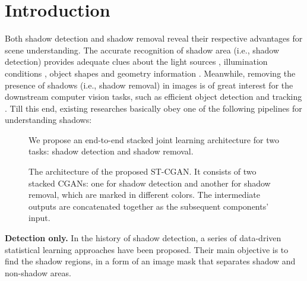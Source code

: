 \documentclass[10pt,twocolumn,letterpaper]{article}
\begin{document}
\section{Introduction}

Both shadow detection and shadow removal reveal their respective advantages for scene understanding. The accurate recognition of shadow area (i.e., shadow detection) provides adequate clues about the light sources \cite{lalonde2009estimating}, illumination conditions \cite{panagopoulos2009robust,panagopoulos2011illumination,panagopoulos2013simultaneous}, object shapes \cite{okabe2009attached} and geometry information \cite{junejo2008estimating,karsch2011rendering}. Meanwhile, removing the presence of shadows (i.e., shadow removal) in images is of great interest for the downstream computer vision tasks, such as efficient object detection and tracking \cite{cucchiara2001improving,mikic2000moving}. Till this end, existing researches basically obey one of the following pipelines for understanding shadows:

\begin{figure}[t]
	\begin{center}
		\setlength{\fboxrule}{0pt}
	\end{center}
	\vspace{-10pt}
	\caption{We propose an end-to-end stacked joint learning architecture for two tasks: shadow detection and shadow removal.}
	\label{fig_tasks_cropped}
	\vspace{-12pt}
\end{figure}

\begin{figure*}[t]
	\begin{center}
		\setlength{\fboxrule}{0pt}
	\end{center}
	\vspace{-8pt}
	\caption{The architecture of the proposed ST-CGAN. It consists of two stacked CGANs: one for shadow detection and another for shadow removal, which are marked in different colors. The intermediate outputs are concatenated together as the subsequent components' input. }	
	\label{fig_pipeline_cropped}
	\vspace{-8pt}
\end{figure*}

\textbf{Detection only.} In the history of shadow detection, a series of data-driven statistical learning approaches \cite{huang2011characterizes,lalonde2010detecting,vicente2016noisy,zhu2010learning,khan2014automatic,vicente2015leave} have been proposed. Their main objective is to find the shadow regions, in a form of an image mask that separates shadow and non-shadow areas.
\end{document}

